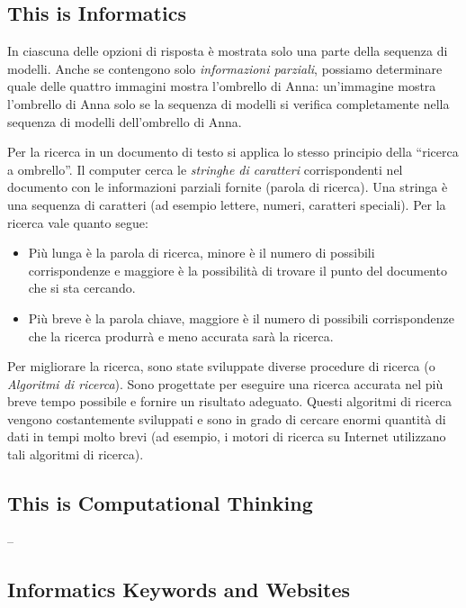 \documentclass[a4paper,11pt]{report}
\begin{document}
\subsection*{This is Informatics}

In ciascuna delle opzioni di risposta è mostrata solo una parte della sequenza di modelli. Anche se contengono solo \emph{informazioni parziali}, possiamo determinare quale delle quattro immagini mostra l’ombrello di Anna: un’immagine mostra l’ombrello di Anna solo se la sequenza di modelli si verifica completamente nella sequenza di modelli dell’ombrello di Anna.

Per la ricerca in un documento di testo si applica lo stesso principio della \enquote{ricerca a ombrello}. Il computer cerca le \emph{stringhe di caratteri} corrispondenti nel documento con le informazioni parziali fornite (parola di ricerca). Una stringa è una sequenza di caratteri (ad esempio lettere, numeri, caratteri speciali).
Per la ricerca vale quanto segue:

\begin{itemize}
  \item Più lunga è la parola di ricerca, minore è il numero di possibili corrispondenze e maggiore è la possibilità di trovare il punto del documento che si sta cercando.
  \item Più breve è la parola chiave, maggiore è il numero di possibili corrispondenze che la ricerca produrrà e meno accurata sarà la ricerca.
\end{itemize}

Per migliorare la ricerca, sono state sviluppate diverse procedure di ricerca (o \emph{Algoritmi di ricerca}). Sono progettate per eseguire una ricerca accurata nel più breve tempo possibile e fornire un risultato adeguato. Questi algoritmi di ricerca vengono costantemente sviluppati e sono in grado di cercare enormi quantità di dati in tempi molto brevi (ad esempio, i motori di ricerca su Internet utilizzano tali algoritmi di ricerca).


\subsection*{This is Computational Thinking}

–


\subsection*{Informatics Keywords and Websites}
\end{document}
